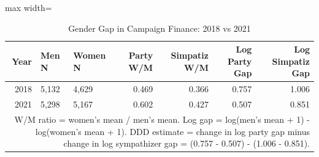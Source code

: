\begin{table}[!h]
\centering
\caption{\label{tab:tab2_gender_gap}Gender Gap in Campaign Finance: 2018 vs 2021}
\centering
\begin{adjustbox}{max width=\textwidth}
\begin{tabular}[t]{rllrrrr}
\toprule
Year & Men N & Women N & Party W/M & Simpatiz W/M & Log Party Gap & Log Simpatiz Gap\\
\midrule
2018 & 5,132 & 4,629 & 0.469 & 0.366 & 0.757 & 1.006\\
2021 & 5,298 & 5,167 & 0.602 & 0.427 & 0.507 & 0.851\\
\bottomrule
\multicolumn{7}{p{0.95\textwidth}}{\rule{0pt}{1em}\footnotesize W/M ratio = women's mean / men's mean. Log gap = log(men's mean + 1) - log(women's mean + 1). DDD estimate = change in log party gap minus change in log sympathizer gap = (0.757 - 0.507) - (1.006 - 0.851).}\\
\end{tabular}
\end{adjustbox}
\end{table}
